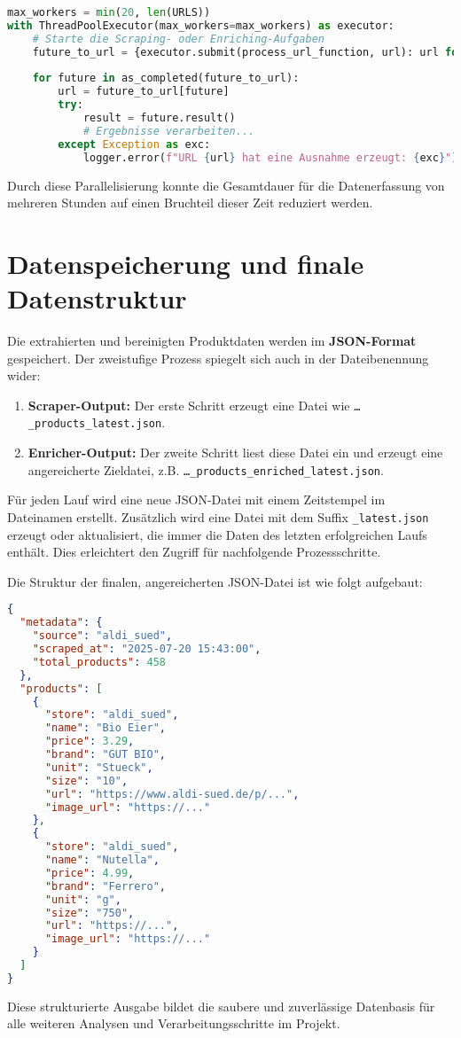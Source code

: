 \begin{lstlisting}[language=Python, caption={Parallele Ausführung mit ThreadPoolExecutor}]
max_workers = min(20, len(URLS))
with ThreadPoolExecutor(max_workers=max_workers) as executor:
    # Starte die Scraping- oder Enriching-Aufgaben
    future_to_url = {executor.submit(process_url_function, url): url for url in URLS}
    
    for future in as_completed(future_to_url):
        url = future_to_url[future]
        try:
            result = future.result()
            # Ergebnisse verarbeiten...
        except Exception as exc:
            logger.error(f"URL {url} hat eine Ausnahme erzeugt: {exc}")
\end{lstlisting}
Durch diese Parallelisierung konnte die Gesamtdauer für die Datenerfassung von mehreren Stunden auf einen Bruchteil dieser Zeit reduziert werden.

\section{Datenspeicherung und finale Datenstruktur}
\label{sec:scraping_datenspeicherung}
Die extrahierten und bereinigten Produktdaten werden im \textbf{JSON-Format} gespeichert. Der zweistufige Prozess spiegelt sich auch in der Dateibenennung wider:
\begin{enumerate}
    \item \textbf{Scraper-Output:} Der erste Schritt erzeugt eine Datei wie \texttt{\ldots\_products\_latest.json}.
    \item \textbf{Enricher-Output:} Der zweite Schritt liest diese Datei ein und erzeugt eine angereicherte Zieldatei, z.B. \texttt{\ldots\_products\_enriched\_latest.json}.
\end{enumerate}

Für jeden Lauf wird eine neue JSON-Datei mit einem Zeitstempel im Dateinamen erstellt. Zusätzlich wird eine Datei mit dem Suffix \texttt{\_latest.json} erzeugt oder aktualisiert, die immer die Daten des letzten erfolgreichen Laufs enthält. Dies erleichtert den Zugriff für nachfolgende Prozessschritte.

Die Struktur der finalen, angereicherten JSON-Datei ist wie folgt aufgebaut:
\begin{lstlisting}[language=JSON, caption={Beispielhafte JSON-Struktur der finalen Ausgabedatei}]
{
  "metadata": {
    "source": "aldi_sued",
    "scraped_at": "2025-07-20 15:43:00",
    "total_products": 458
  },
  "products": [
    {
      "store": "aldi_sued",
      "name": "Bio Eier",
      "price": 3.29,
      "brand": "GUT BIO",
      "unit": "Stueck",
      "size": "10",
      "url": "https://www.aldi-sued.de/p/...",
      "image_url": "https://..."
    },
    {
      "store": "aldi_sued",
      "name": "Nutella",
      "price": 4.99,
      "brand": "Ferrero",
      "unit": "g",
      "size": "750",
      "url": "https://...",
      "image_url": "https://..."
    }
  ]
}
\end{lstlisting}
Diese strukturierte Ausgabe bildet die saubere und zuverlässige Datenbasis für alle weiteren Analysen und Verarbeitungsschritte im Projekt.

